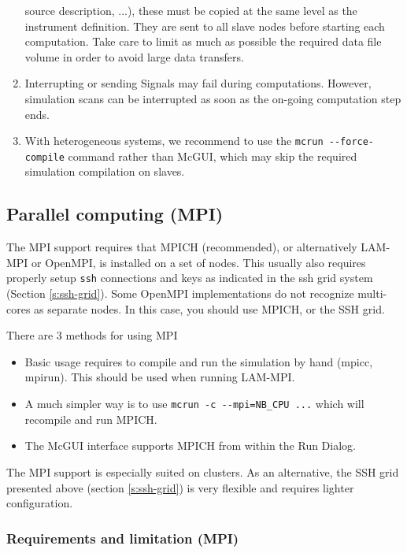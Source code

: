 \begin{enumerate}
{      source description, ...), these must be copied at the same level as the
      instrument definition. They are sent to all slave nodes before starting
      each computation.  Take care to limit as much as possible the required
      data file volume in order to avoid large data transfers.}
  \item Interrupting or sending Signals may fail during computations. However,
  simulation scans can be interrupted as soon as the on-going computation
  step ends.
\item With heterogeneous systems, we recommend to use the
  \verb+mcrun --force-compile+ command rather than McGUI, which may skip the
  required simulation compilation on slaves.
  \end{enumerate}

\subsection{Parallel computing (MPI)}

\label{s:mpi}
The MPI support requires that MPICH (recommended), or alternatively LAM-MPI or
OpenMPI, is installed on a set of nodes. This usually also requires properly
setup \texttt{ssh} connections and keys as indicated in the ssh grid system
(Section \ref{s:ssh-grid}). Some OpenMPI implementations do not recognize
multi-cores as separate nodes. In this case, you should use MPICH, or the SSH
grid.

There are 3 methods for using MPI
\begin{itemize}
\item Basic usage requires to compile and run the simulation by hand (mpicc, mpirun).
  This should be used when running LAM-MPI.
\item A much simpler way is to use \verb+mcrun -c --mpi=NB_CPU ...+ which will
  recompile and run MPICH.
\item The McGUI interface supports MPICH from within the Run Dialog.
\end{itemize}

The MPI support is especially suited on clusters. As an alternative, the SSH
grid presented above (section \ref{s:ssh-grid}) is very flexible and requires
lighter configuration.

\subsubsection{Requirements and limitation (MPI)}

